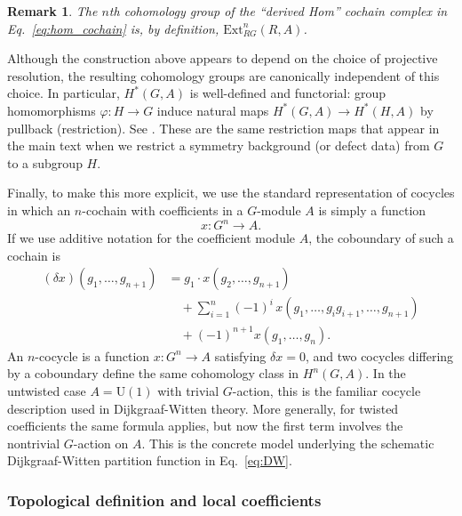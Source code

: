 \documentclass[aps,prx,reprint,superscriptaddress,twocolumn,amsmath,amssymb,amsfonts, nofootinbib]{revtex4-2}
\newcommand{\U}{\text{U}}
\theoremstyle{apsstyle}
\newtheorem{remark}[theorem]{Remark}
\begin{document}
\bigskip

\begin{remark}
    The $n$th cohomology group of the ``derived Hom'' cochain complex in Eq.~\eqref{eq:hom_cochain} is, by definition, $\mathrm{Ext}^{n}_{RG}(R,A)$.
\end{remark}

\bigskip 

\noindent Although the construction above appears to depend on the choice of projective resolution, the resulting cohomology groups are canonically independent of this choice. In particular, $H^\ast(G,A)$ is well-defined and functorial: group homomorphisms $\varphi:H\to G$ induce natural maps $H^\ast(G,A)\to H^\ast(H,A)$ by pullback (restriction). See \cite{evens1991cohomology}. These are the same restriction maps that appear in the main text when we restrict a symmetry background (or defect data) from $G$ to a subgroup $H$.

\bigskip 

Finally, to make this more explicit, we use the standard representation of cocycles in which an $n$-cochain with coefficients in a $G$-module $A$ is simply a function
\begin{equation*}
    x:G^{n}\to A.
\end{equation*}
If we use additive notation for the coefficient module $A$, the coboundary of such a cochain is
\begin{equation}
\label{eq:bar_differential}
\begin{aligned}
(\delta x)(g_{1},\dots,g_{n+1})
&=
g_{1}\cdot x(g_{2},\dots,g_{n+1}) \\
&\quad + \sum_{i=1}^{n}(-1)^{i}\,
x(g_{1},\dots,g_{i}g_{i+1},\dots,g_{n+1}) \\
&\quad +(-1)^{n+1}x(g_{1},\dots,g_{n}).
\end{aligned}
\end{equation}
An $n$-cocycle is a function $x:G^{n}\to A$ satisfying $\delta x=0$, and two cocycles differing by a coboundary define the same cohomology class in $H^{n}(G,A)$. In the untwisted case $A=\U(1)$ with trivial $G$-action, this is the familiar cocycle description used in Dijkgraaf-Witten theory. More generally, for twisted coefficients the same formula applies, but now the first term involves the nontrivial $G$-action on $A$. This is the concrete model underlying the schematic Dijkgraaf-Witten partition function in Eq.~\eqref{eq:DW}.


\subsubsection{Topological definition and local coefficients}
\end{document}
